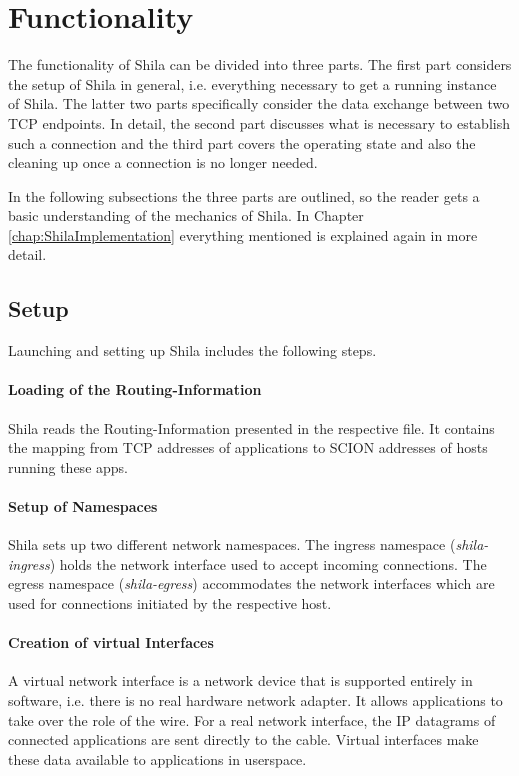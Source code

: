 \newpage
\section{Functionality}
\label{sec:ShilaFunctionality}

The functionality of Shila can be divided into three parts. The first part considers the setup of Shila in general, i.e. everything necessary to get a running instance of Shila. The latter two parts specifically consider the data exchange between two TCP endpoints. In detail, the second part discusses what is necessary to establish such a connection and the third part covers the operating state and also the cleaning up once a connection is no longer needed. 

In the following subsections the three parts are outlined, so the reader gets a basic understanding of the mechanics of Shila. In Chapter \ref{chap:ShilaImplementation} everything mentioned is explained again in more detail.

\subsection*{Setup}

Launching and setting up Shila includes the following steps.

\paragraph{Loading of the Routing-Information} Shila reads the Routing-Information presented in the respective file. It contains the mapping from TCP addresses of applications to SCION addresses of hosts running these apps. 

\paragraph{Setup of Namespaces} Shila sets up two different network namespaces. The ingress namespace (\textit{shila-ingress}) holds the network interface used to accept incoming connections. The egress namespace (\textit{shila-egress}) accommodates the network interfaces which are used for connections initiated by the respective host.

\paragraph{Creation of virtual Interfaces} A virtual network interface is a network device that is supported entirely in software, i.e. there is no real hardware network adapter. It allows applications to take over the role of the wire. For a real network interface, the IP datagrams of connected applications are sent directly to the cable. Virtual interfaces make these data available to applications in userspace.

